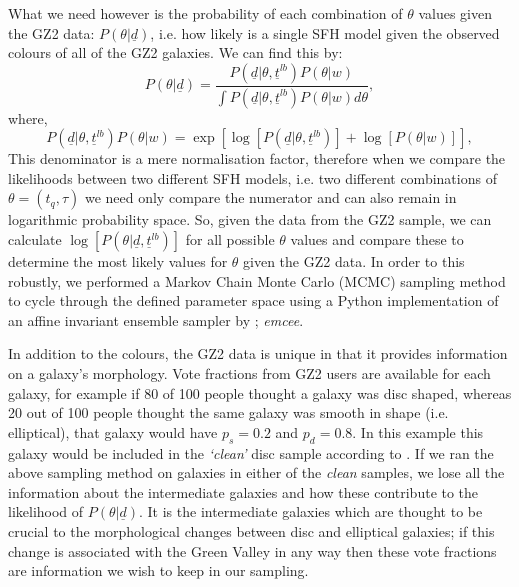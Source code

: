 \documentclass{mn2e}
\begin{document}
What we need however is the probability of each combination of $\theta$ values given the GZ2 data: $P(\theta|\underline{d})$, i.e. how likely is a single SFH model given the observed colours of all of the GZ2 galaxies. We can find this by:
\begin{equation*}
P(\theta|\underline{d}) = \frac{P(\underline{d}|\theta, \underline{t}^{lb})P(\theta | w)}{\int P(\underline{d}|\theta, \underline{t}^{lb})P(\theta | w) d\theta},
\end{equation*}
where,
\begin{equation*}
P(\underline{d}|\theta, \underline{t}^{lb})P(\theta | w) = \exp{\left[\log{[P(\underline{d}|\theta, \underline{t}^{lb})]} + \log{[P(\theta | w)]}\right]},
\end{equation*}
This denominator is a mere normalisation factor, therefore when we compare the likelihoods between two different SFH models, i.e. two different combinations of $\theta = (t_{q}, \tau)$ we need only compare the numerator and can also remain in logarithmic probability space. So, given the data from the GZ2 sample, we can calculate $\log[P(\theta|\underline{d}, \underline{t}^{lb})]$ for all possible $\theta$ values and compare these to determine the most likely values for $\theta$ given the GZ2 data. In order to this robustly, we performed a Markov Chain Monte Carlo (MCMC) sampling method to cycle through the defined parameter space using a Python implementation of an affine invariant ensemble sampler by \cite{Dan}; \emph{emcee}.

In addition to the colours, the GZ2 data is unique in that it provides information on a galaxy's morphology. Vote fractions from GZ2 users are available for each galaxy, for example if 80 of 100 people thought a galaxy was disc shaped, whereas 20 out of 100 people thought the same galaxy was smooth in shape (i.e. elliptical), that galaxy would have $p_{s} = 0.2$ and $p_{d} = 0.8$. In this example this galaxy would be included in the \emph{`clean'} disc sample according to \cite{GZ2}. If we ran the above sampling method on galaxies in either of the \emph{clean} samples, we lose all the information about the intermediate galaxies and how these contribute to the likelihood of $P(\theta|\underline{d})$. It is the intermediate galaxies which are thought to be crucial to the morphological changes between disc and elliptical galaxies; if this change is associated with the Green Valley in any way then these vote fractions are information we wish to keep in our sampling. 
\end{document}
